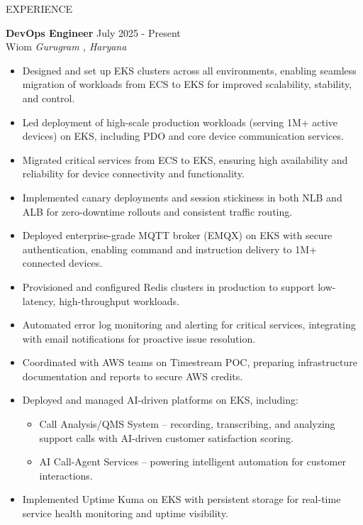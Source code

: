 \documentclass{resume} %
\begin{document}
\begin{rSection}{EXPERIENCE}

\textbf{DevOps Engineer} \hfill July 2025 - Present\\
Wiom \hfill \textit{Gurugram , Haryana}
 \begin{itemize}
    \itemsep -3pt {} 
    \item Designed and set up EKS clusters across all environments, enabling seamless migration of workloads from ECS to EKS for improved scalability, stability, and control.
    \item Led deployment of high-scale production workloads (serving 1M+ active devices) on EKS, including PDO and core device communication services.
    \item Migrated critical services from ECS to EKS, ensuring high availability and reliability for device connectivity and functionality.
    \item Implemented canary deployments and session stickiness in both NLB and ALB for zero-downtime rollouts and consistent traffic routing.
    \item Deployed enterprise-grade MQTT broker (EMQX) on EKS with secure authentication, enabling command and instruction delivery to 1M+ connected devices.
    \item Provisioned and configured Redis clusters in production to support low-latency, high-throughput workloads.
    \item Automated error log monitoring and alerting for critical services, integrating with email notifications for proactive issue resolution.
    \item Coordinated with AWS teams on Timestream POC, preparing infrastructure documentation and reports to secure AWS credits.
    
    \item Deployed and managed AI-driven platforms on EKS, including:
        \begin{itemize}
            \item Call Analysis/QMS System – recording, transcribing, and analyzing support calls with AI-driven customer satisfaction scoring.
            \item AI Call-Agent Services – powering intelligent automation for customer interactions.
        \end{itemize}
    \item Implemented Uptime Kuma on EKS with persistent storage for real-time service health monitoring and uptime visibility.
 \end{itemize}


\end{rSection}
\end{document}
